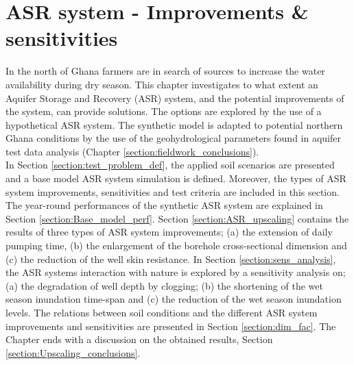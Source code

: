 \chapter{ASR system - Improvements \& sensitivities}
\label{chapter:model_scenarios}
In the north of Ghana farmers are in search of sources to increase the water availability during dry season. This chapter investigates to what extent an Aquifer Storage and Recovery (ASR) system, and the potential improvements of the system, can provide solutions. The options are explored by the use of a hypothetical ASR system. The synthetic model is adapted to potential northern Ghana conditions by the use of the geohydrological parameters found in aquifer test data analysis (Chapter \ref{section:fieldwork_conclusions}). \\
In Section \ref{section:test_problem_def}, the applied soil scenarios are presented and a base model ASR system simulation is defined. Moreover, the types of ASR system improvements, sensitivities and test criteria are included in this section. The year-round performances of the synthetic ASR system are explained in Section \ref{section:Base_model_perf}. Section \ref{section:ASR_upscaling} contains the results of three types of ASR system improvements; (a) the extension of daily pumping time, (b) the enlargement of the borehole cross-sectional dimension and (c) the reduction of the well skin resistance. In Section \ref{section:sens_analysis}, the ASR systems interaction with nature is explored by a sensitivity analysis on; (a) the degradation of well depth by clogging; (b) the shortening of the wet season inundation time-span and (c) the reduction of the wet season inundation levels. The relations between soil conditions and the different ASR system improvements and sensitivities are presented in Section \ref{section:dim_fac}. The Chapter ends with a discussion on the obtained results, Section \ref{section:Upscaling_conclusions}. 
%
%
% 
%
%
%
%
